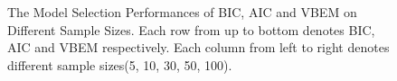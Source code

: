 \documentclass[12pt,a4paper]{article}
\theoremstyle{definition}
\begin{document}
\begin{figure}[htbp]
{	}
	\caption{The Model Selection Performances of BIC, AIC and VBEM on Different Sample Sizes. Each row from up to bottom denotes BIC, AIC and VBEM respectively. Each column from left to right denotes different sample sizes(5, 10, 30, 50, 100).}
	\label{fig:sample_comp1}
\end{figure}
\end{document}
